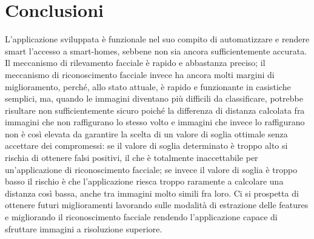 \chapter{Conclusioni}
L'applicazione sviluppata è funzionale nel suo compito di automatizzare e rendere smart l'accesso a smart-homes, sebbene non sia ancora sufficientemente accurata. Il meccanismo di rilevamento facciale è rapido e abbastanza preciso; il meccanismo di riconoscimento facciale invece ha ancora molti margini di miglioramento, perché, allo stato attuale, è rapido e funzionante in casistiche semplici, ma, quando le immagini diventano più difficili da classificare, potrebbe risultare non sufficientemente sicuro poiché la differenza di distanza calcolata fra immagini che non raffigurano lo stesso volto e immagini che invece lo raffigurano non è così elevata da garantire la scelta di un valore di soglia ottimale senza accettare dei compromessi: se il valore di soglia determinato è troppo alto si rischia di ottenere falsi positivi, il che è totalmente inaccettabile per un'applicazione di riconoscimento facciale; se invece il valore di soglia è troppo basso il rischio è che l'applicazione riesca troppo raramente a calcolare una distanza così bassa, anche tra immagini molto simili fra loro. Ci si prospetta di ottenere futuri miglioramenti lavorando sulle modalità  di estrazione delle features e migliorando il riconoscimento facciale rendendo l'applicazione capace di sfruttare immagini a risoluzione superiore.